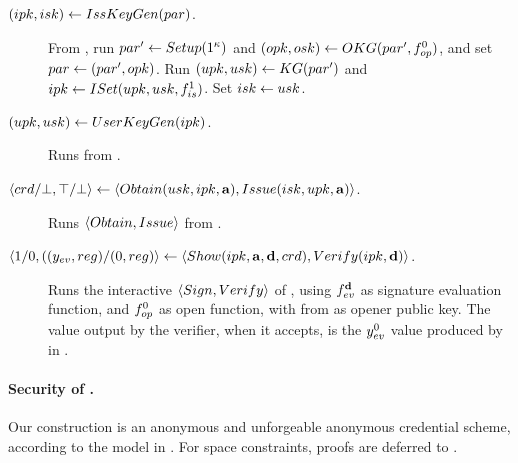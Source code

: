 \begin{description}
\item[$(ipk,isk) \gets IssKeyGen(par)$.] From \CUASGenInt, run $par'
  \gets Setup(1^\kappa)$ and $(opk,osk) \gets OKG(par',
  f_{op}^0)$, and set $par \gets (par',opk)$. Run $(upk,usk) \gets
  KG(par')$ and $ipk \gets ISet(upk,usk,f_{is}^1)$. Set $isk \gets
  usk$.
\item[$(upk,usk) \gets UserKeyGen(ipk)$.] Runs \KeyGen from \CUASGenInt.
\item[$\langle crd/\bot,\top/\bot \rangle \gets
  \langle Obtain(usk,ipk,\mathbf{a}),Issue(isk,upk,\mathbf{a}) \rangle$.]
  Runs $\langle Obtain,Issue \rangle$ from \CUASGenInt.
\item[$\langle 1/0,((y_{ev},reg)/(0,reg)\rangle
  \gets \langle Show(ipk,\mathbf{a},\mathbf{d},
  crd),Verify(ipk,\mathbf{d}) \rangle$.]
  Runs the interactive $\langle Sign, Verify\rangle$ of  \CUASGenInt,
  using $f_{ev}^{\mathbf{d}}$ as signature evaluation function, and $f_{op}^0$ as
  open function, with \opk from \parm as opener public key. The \yeval value
  output by the verifier, when it accepts, is the $y_{ev}^0$ value produced by
  \Sign in \CUASGenInt.
\end{description}

\paragraph{Security of \CUASAC.} %
Our \CUASAC construction is an anonymous and unforgeable anonymous credential
scheme, according to the model in \cite{fhs19}. For space constraints,
proofs are deferred to .



